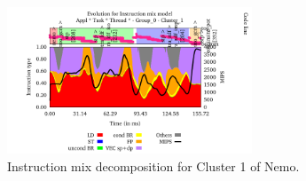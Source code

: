 \begin{figure}
  \centering
  \includegraphics[width=0.65\textwidth]{figures/user-guide/nemo_cluster1_instructionmix.pdf}
  \caption{Instruction mix decomposition for Cluster 1 of Nemo.}
  \label{fig:Nemo_cluster1_instructionmix}
\end{figure}
